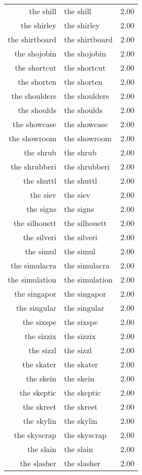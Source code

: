 \begin{table}[ht]
\begin{tabular}{rlr}
  the shill & the shill & 2.00 \\ 
  the shirley & the shirley & 2.00 \\ 
  the shirtboard & the shirtboard & 2.00 \\ 
  the shojobin & the shojobin & 2.00 \\ 
  the shortcut & the shortcut & 2.00 \\ 
  the shorten & the shorten & 2.00 \\ 
  the shoulders & the shoulders & 2.00 \\ 
  the shoulds & the shoulds & 2.00 \\ 
  the showcase & the showcase & 2.00 \\ 
  the showroom & the showroom & 2.00 \\ 
  the shrub & the shrub & 2.00 \\ 
  the shrubberi & the shrubberi & 2.00 \\ 
  the shuttl & the shuttl & 2.00 \\ 
  the siev & the siev & 2.00 \\ 
  the signs & the signs & 2.00 \\ 
  the silhouett & the silhouett & 2.00 \\ 
  the silveri & the silveri & 2.00 \\ 
  the simul & the simul & 2.00 \\ 
  the simulacra & the simulacra & 2.00 \\ 
  the simulation & the simulation & 2.00 \\ 
  the singapor & the singapor & 2.00 \\ 
  the singular & the singular & 2.00 \\ 
  the sixspe & the sixspe & 2.00 \\ 
  the sizzix & the sizzix & 2.00 \\ 
  the sizzl & the sizzl & 2.00 \\ 
  the skater & the skater & 2.00 \\ 
  the skein & the skein & 2.00 \\ 
  the skeptic & the skeptic & 2.00 \\ 
  the skreet & the skreet & 2.00 \\ 
  the skylin & the skylin & 2.00 \\ 
  the skyscrap & the skyscrap & 2.00 \\ 
  the slain & the slain & 2.00 \\ 
  the slasher & the slasher & 2.00 \\ 

\end{tabular}
\end{table}
